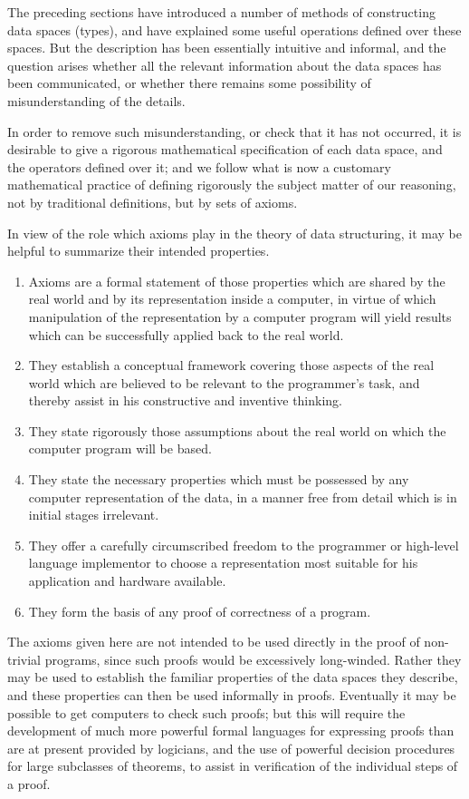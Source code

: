 The preceding sections have introduced a number of methods of constructing data spaces (types), and have explained some useful operations defined over these spaces. But the description has been essentially intuitive and informal, and the question arises whether all the relevant information about the data spaces has been communicated, or whether there remains some possibility of misunderstanding of the details.

In order to remove such misunderstanding, or check that it has not occurred, it is desirable to give a rigorous mathematical specification of each data space, and the operators defined over it; and we follow what is now a customary mathematical practice of defining rigorously the subject matter of our reasoning, not by traditional definitions, but by sets of axioms.

In view of the role which axioms play in the theory of data structuring, it may be helpful to summarize their intended properties.

\begin{enumerate}[wide, nosep, label=(\arabic*)]
	\item Axioms are a formal statement of those properties which are shared by the real world and by its representation inside a computer, in virtue of which manipulation of the representation by a computer program will yield results which can be successfully applied back to the real world.
	\item They establish a conceptual framework covering those aspects of the real world which are believed to be relevant to the programmer's task, and thereby assist in his constructive and inventive thinking.
	\item They state rigorously those assumptions about the real world on which the computer program will be based.
	\item They state the necessary properties which must be possessed by any computer representation of the data, in a manner free from detail which is in initial stages irrelevant.
	\item They offer a carefully circumscribed freedom to the programmer or high-level language implementor to choose a representation most suitable for his application and hardware available.
	\item They form the basis of any proof of correctness of a program.
\end{enumerate}

The axioms given here are not intended to be used directly in the proof of non-trivial programs, since such proofs would be excessively long-winded. Rather they may be used to establish the familiar properties of the data spaces they describe, and these properties can then be used informally in proofs. Eventually it may be possible to get computers to check such proofs; but this will require the development of much more powerful formal languages for expressing proofs than are at present provided by logicians, and the use of powerful decision procedures for large subclasses of theorems, to assist in verification of the individual steps of a proof.

